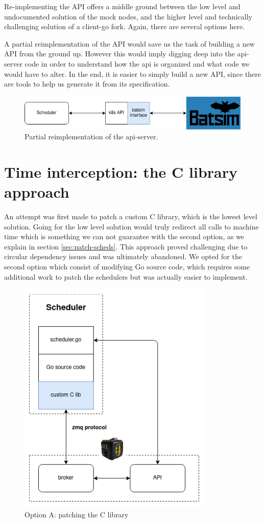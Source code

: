 Re-implementing the API offers a middle ground between the low level and
undocumented solution of the mock nodes, and the higher level and technically
challenging solution of a client-go fork. Again, there are several options here.

A partial reimplementation of the API would save us the task of building a new
API from the ground up. However this would imply digging deep into the
api-server code in order to understand how the api is organized and what code
we would have to alter. In the end, it is easier to simply build a new API,
since there are tools to help us generate it from its specification.

\begin{figure}[h]
	\centering
	\includegraphics[scale=0.8]{../imgs/partial-reimplem.png}
	\caption{Partial reimplementation of the api-server.}
	\label{fig:partial_reimp}
\end{figure}

\section{Time interception: the C library approach}

An attempt was first made to patch a custom C library, which is the lowest level
solution. Going for the low level solution would truly redirect all calls to
machine time which is something we can not guarantee with the second option, as
we explain in section \ref{sec:patch-scheds}. This approach proved challenging
due to circular dependency issues and was ultimately abandoned. We opted for
the second option which consist of modifying Go source code, which requires
some additional work to patch the schedulers but was actually easier to
implement.

\begin{figure}
	\centering
	\includegraphics[scale=0.5]{../imgs/time-hijack-C.png}
	\caption{Option A: patching the C library}
	\label{fig:patch-C}
\end{figure}
